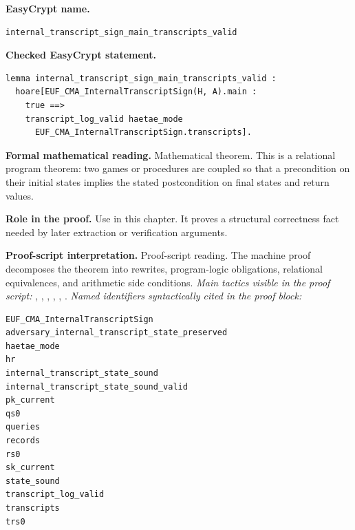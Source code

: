 \begin{formaltheorem}
\noindent\textbf{EasyCrypt name.}
\begin{lstlisting}[language=EasyCrypt,basicstyle=\ttfamily\scriptsize]
internal_transcript_sign_main_transcripts_valid
\end{lstlisting}
\noindent\textbf{Checked EasyCrypt statement.}
\begin{lstlisting}[language=EasyCrypt,basicstyle=\ttfamily\scriptsize]
lemma internal_transcript_sign_main_transcripts_valid :
  hoare[EUF_CMA_InternalTranscriptSign(H, A).main :
    true ==>
    transcript_log_valid haetae_mode
      EUF_CMA_InternalTranscriptSign.transcripts].
\end{lstlisting}
\noindent\textbf{Formal mathematical reading.}
Mathematical theorem. This is a relational program theorem: two games or procedures are coupled so that a precondition on their initial states implies the stated postcondition on final states and return values.

\noindent\textbf{Role in the proof.}
Use in this chapter. It proves a structural correctness fact needed by later extraction or verification arguments.

\noindent\textbf{Proof-script interpretation.}
Proof-script reading. The machine proof decomposes the theorem into rewrites, program-logic obligations, relational equivalences, and arithmetic side conditions.
\emph{Main tactics visible in the proof script:} , , , , , .
\emph{Named identifiers syntactically cited in the proof block:}
\begin{lstlisting}[language=EasyCrypt,basicstyle=\ttfamily\scriptsize]
EUF_CMA_InternalTranscriptSign
adversary_internal_transcript_state_preserved
haetae_mode
hr
internal_transcript_state_sound
internal_transcript_state_sound_valid
pk_current
qs0
queries
records
rs0
sk_current
state_sound
transcript_log_valid
transcripts
trs0
\end{lstlisting}

\end{formaltheorem}

